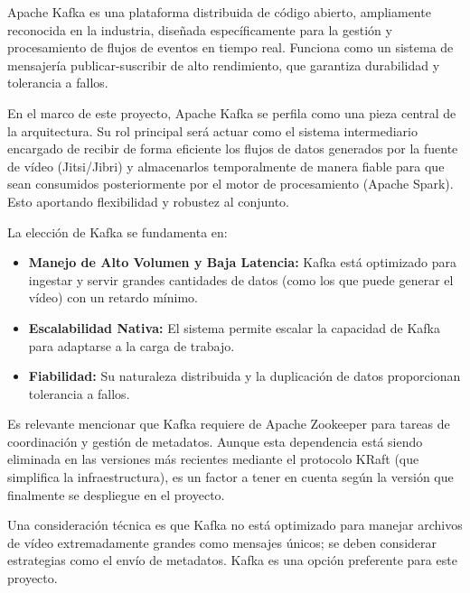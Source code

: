 Apache Kafka es una plataforma distribuida de código abierto, ampliamente reconocida en la industria, diseñada específicamente para la gestión y procesamiento de flujos de eventos en tiempo real. Funciona como un sistema de mensajería publicar-suscribir de alto rendimiento, que garantiza durabilidad y tolerancia a fallos.

En el marco de este proyecto, Apache Kafka se perfila como una pieza central de la arquitectura. Su rol principal será actuar como el sistema intermediario encargado de recibir de forma eficiente los flujos de datos generados por la fuente de vídeo (Jitsi/Jibri) y almacenarlos temporalmente de manera fiable para que sean consumidos posteriormente por el motor de procesamiento (Apache Spark). Esto aportando flexibilidad y robustez al conjunto.

La elección de Kafka se fundamenta en:
\begin{itemize}
    \item \textbf{Manejo de Alto Volumen y Baja Latencia:} Kafka está optimizado para ingestar y servir grandes cantidades de datos (como los que puede generar el vídeo) con un retardo mínimo.
    \item \textbf{Escalabilidad Nativa:} El sistema permite escalar la capacidad de Kafka para adaptarse a la carga de trabajo.
    \item \textbf{Fiabilidad:} Su naturaleza distribuida y la duplicación de datos proporcionan tolerancia a fallos.
\end{itemize}

Es relevante mencionar que Kafka requiere de Apache Zookeeper para tareas de coordinación y gestión de metadatos. Aunque esta dependencia está siendo eliminada en las versiones más recientes mediante el protocolo KRaft (que simplifica la infraestructura), es un factor a tener en cuenta según la versión que finalmente se despliegue en el proyecto.

Una consideración técnica es que Kafka no está optimizado para manejar archivos de vídeo extremadamente grandes como mensajes únicos; se deben considerar estrategias como el envío de metadatos. Kafka es una opción preferente para este proyecto.
